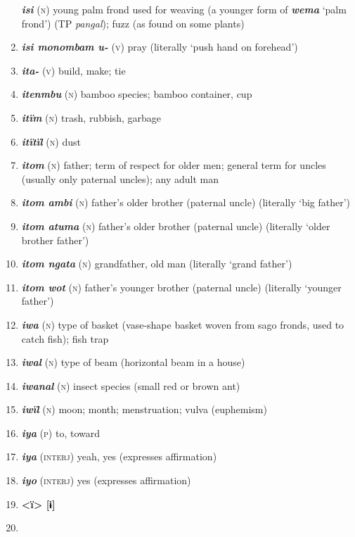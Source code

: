 \begin{enumerate}[noitemsep, label={}, align=left, widest=190, labelsep=1ex,leftmargin=*,itemindent=-10pt]
\textbf{\textit{isi}} (\textsc{n}) young palm frond used for weaving (a younger form of \textbf{\textit{wema}} ‘palm frond’) (TP \textit{pangal}); fuzz (as found on some plants) \item 
\textbf{\textit{isi monombam u-}} (\textsc{v}) pray (literally ‘push hand on forehead’) \item 
\textbf{\textit{ita-}} (\textsc{v}) build, make; tie \item 
\textbf{\textit{itenmbu}} (\textsc{n}) bamboo species; bamboo container, cup \item 
\textbf{\textit{itïm}} (\textsc{n}) trash, rubbish, garbage \item 
\textbf{\textit{itïtïl}} (\textsc{n}) dust \item 
\textbf{\textit{itom}} (\textsc{n}) father; term of respect for older men; general term for uncles (usually only paternal uncles); any adult man \item 
\textbf{\textit{itom ambi}} (\textsc{n}) father’s older brother (paternal uncle) (literally ‘big father’) \item 
\textbf{\textit{itom atuma}} (\textsc{n}) father’s older brother (paternal uncle) (literally ‘older brother father’) \item 
\textbf{\textit{itom ngata}} (\textsc{n}) grandfather, old man (literally ‘grand father’) \item 
\textbf{\textit{itom wot}} (\textsc{n}) father’s younger brother (paternal uncle) (literally ‘younger \linebreak father’) \item 
\textbf{\textit{iwa}} (\textsc{n}) type of basket (vase-shape basket woven from sago fronds, used to catch fish); fish trap \item 
\textbf{\textit{iwal}} (\textsc{n}) type of beam (horizontal beam in a house) \item 
\textbf{\textit{iwanal}} (\textsc{n}) insect species (small red or brown ant) \item 
\textbf{\textit{iwïl}} (\textsc{n}) moon; month; menstruation; vulva (euphemism) \item 
\textbf{\textit{iya}} (\textsc{p}) to, toward \item 
\textbf{\textit{iya}} (\textsc{interj}) yeah, yes (expresses affirmation) \item 
\textbf{\textit{iyo}} (\textsc{interj}) yes (expresses affirmation)\\ \item 

\noindent \textbf{<ï>        [ɨ]}\\ \item


\end{enumerate}
